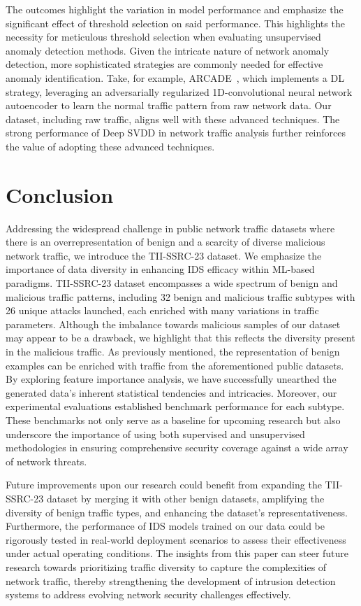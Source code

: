 \documentclass[lettersize,journal]{IEEEtran}
\begin{document}
The outcomes highlight the variation in model performance and emphasize the significant effect of threshold selection on said performance. This highlights the necessity for meticulous threshold selection when evaluating unsupervised anomaly detection methods. Given the intricate nature of network anomaly detection, more sophisticated strategies are commonly needed for effective anomaly identification. Take, for example, ARCADE~\cite{lunardi2022arcade}, which implements a \ac{DL} strategy, leveraging an adversarially regularized 1D-convolutional neural network autoencoder to learn the normal traffic pattern from raw network data. Our dataset, including raw traffic, aligns well with these advanced techniques. The strong performance of \ac{Deep SVDD} in network traffic analysis further reinforces the value of adopting these advanced techniques. 

\section{Conclusion} \label{sec:conclusion}
Addressing the widespread challenge in public network traffic datasets where there is an overrepresentation of benign and a scarcity of diverse malicious network traffic, we introduce the TII-SSRC-23 dataset. We emphasize the importance of data diversity in enhancing \ac{IDS} efficacy within \ac{ML}-based paradigms. TII-SSRC-23 dataset encompasses a wide spectrum of benign and malicious traffic patterns, including 32 benign and malicious traffic subtypes with 26 unique attacks launched, each enriched with many variations in traffic parameters.  
Although the imbalance towards malicious samples of our dataset may appear to be a drawback, we highlight that this reflects the diversity present in the malicious traffic. As previously mentioned, the representation of benign examples can be enriched with traffic from the aforementioned public datasets.
By exploring feature importance analysis, we have successfully unearthed the generated data's inherent statistical tendencies and intricacies. Moreover, our experimental evaluations established benchmark performance for each subtype. These benchmarks not only serve as a baseline for upcoming research but also underscore the importance of using both supervised and unsupervised methodologies in ensuring comprehensive security coverage against a wide array of network threats.

Future improvements upon our research could benefit from expanding the TII-SSRC-23 dataset by merging it with other benign datasets, amplifying the diversity of benign traffic types, and enhancing the dataset's representativeness. Furthermore, the performance of \ac{IDS} models trained on our data could be rigorously tested in real-world deployment scenarios to assess their effectiveness under actual operating conditions. The insights from this paper can steer future research towards prioritizing traffic diversity to capture the complexities of network traffic, thereby strengthening the development of intrusion detection systems to address evolving network security challenges effectively. 
  
\end{document}
